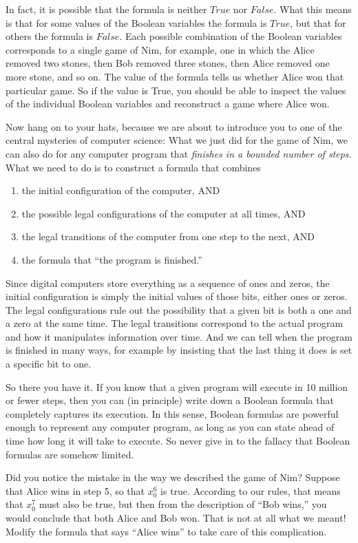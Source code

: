 {{In fact, it is possible that the formula is neither $True$ nor $False$. What this means is that for some values of the 
Boolean variables the formula is $True$, but that for others the formula is $False$. Each possible combination of the 
Boolean variables corresponds to a single game of Nim, for example, one in which the Alice removed two stones, then Bob removed
three stones, then Alice removed one more stone, and so on. The value of the formula tells us whether Alice won that 
particular game. So if the value is True, you should be able to inspect the values of the individual Boolean variables 
and reconstruct a game where Alice won.

Now hang on to your hats, because we are about to introduce you to one of the central mysteries of computer science: 
What we just did for the game of Nim, we can also do for any computer program that \emph{finishes in a bounded number of steps}. 
What we need to do is to construct a formula that combines
\begin{enumerate}
\item the initial configuration of the computer, AND
\item the possible legal configurations of the computer at all times, AND
\item the legal transitions of the computer from one step to the next, AND
\item the formula that ``the program is finished.''
\end{enumerate}
Since digital computers store everything as a sequence of ones and zeros, the initial configuration is simply the initial 
values of those bits, either ones or zeros. The legal configurations rule out the possibility that a given bit is both a 
one and a zero at the same time. The legal transitions correspond to the actual program and how it manipulates information 
over time. And we can tell when the program is finished in many ways, for example by insisting that the last thing it does 
is set a specific bit to one.

So there you have it. If you know that a given program will execute in 10 million or fewer steps, then you can (in principle) 
write down a Boolean formula that completely captures its execution. In this sense, Boolean formulas are powerful enough to 
represent any computer program, as long as you can state ahead of time how long it will take to execute. So never give in to 
the fallacy that Boolean formulas are somehow limited.

\begin{ExerciseList}
\Exercise
Did you notice the mistake in the way we described the game of Nim? Suppose that Alice wins in step 5, so that $x_{0}^{6}$ is
true. According to our rules, that means that $x_{0}^{7}$ must also be true, but then from the description of ``Bob wins,''
you would conclude that both Alice and Bob won. That is not at all what we meant! Modify the formula that says ``Alice wins''
to take care of this complication.


\end{ExerciseList}}}
